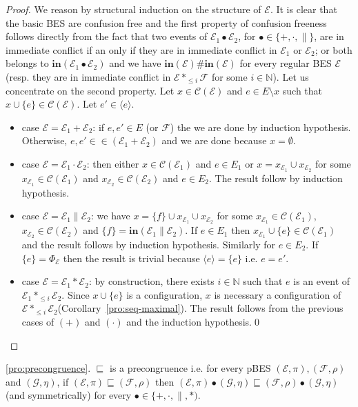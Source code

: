 \documentclass{llncs}
\newcommand{\C}{\mathcal{C}}
\newcommand{\N}{\mathbb{N}}
\newcommand{\EE}{\mathcal{E}}
\newcommand{\FF}{\mathcal{F}}
\newcommand{\G}{\mathcal{G}}
\newcommand{\refby}{\sqsubseteq}
\newcommand{\init}{\mathbf{in}}
\newcommand{\<}{\langle}
\renewcommand{\>}{\rangle}
\newcommand{\exit}{\Phi}
\begin{document}
\begin{proof}
We reason by structural induction on the structure of $\EE$. It is clear that the basic BES are confusion free and the first property of confusion freeness follows directly from the fact that two events of $\EE_1\bullet \EE_2$, for  $\bullet\in\{+,\cdot,\|\}$, are in immediate conflict if an only if they are in immediate conflict in $\EE_1$ or $\EE_2$; or both belongs to $\init(\EE_1\bullet\EE_2)$ and we have $\init(\EE)\#\init(\EE)$ for every regular BES $\EE$(resp. they are in immediate conflict in $\EE*_{\le i}\FF$ for some $i\in\N$). Let us concentrate on the second property. Let $x\in\C(\EE)$ and $e\in E\setminus x$ such that $x\cup\{e\}\in\C(\EE)$. Let $e'\in\<e\>$.
\begin{itemize}
\item case $\EE = \EE_1+\EE_2$: if $e,e'\in E$ (or $\FF$) the we are done by induction hypothesis. Otherwise, $e,e'\in \in(\EE_1+\EE_2)$ and we are done because $x=\emptyset$.
\item case $\EE = \EE_1\cdot\EE_2$: then either $x\in\C(\EE_1)$ and $e\in E_1$ or $x = x_{\EE_1}\cup x_{\EE_2}$ for some $x_{\EE_1}\in\C(\EE_1)$ and $ x_{\EE_2}\in\C(\EE_2)$ and $e\in E_2$. The result follow by induction hypothesis.
\item case $\EE = \EE_1\|\EE_2$: we have $x = \{f\}\cup x_{\EE_1}\cup x_{\EE_2}$ for some $x_{\EE_1}\in\C(\EE_1)$, $ x_{\EE_2}\in\C(\EE_2)$ and $\{f\} = \init(\EE_1\|\EE_2)$. If $e\in E_1$ then $x_{\EE_1}\cup\{e\}\in\C(\EE_1)$ and the result follows by induction hypothesis. Similarly for $e\in E_2$. If $\{e\} = \exit_{\EE}$ then the result is trivial because $\<e\> = \{e\}$ i.e. $e=e'$.
\item case $\EE = \EE_1*\EE_2$: by construction, there exists $i\in\N$ such that $e$ is an event of $\EE_1*_{\le i}\EE_2$. Since $x\cup\{e\}$ is a configuration, $x$ is necessary a configuration of $\EE*_{\le i}\EE_2$(Corollary~\ref{pro:seq-maximal}). The result follows from the previous cases of $(+)$ and $(\cdot)$ and the induction hypothesis.\qed
\end{itemize}
\end{proof}

\begin{repproposition}{\ref{pro:precongruence}.}
$\refby$ is a precongruence i.e. for every pBES $(\EE,\pi), (\FF,\rho)$ and $(\G,\eta)$, if $(\EE,\pi)\refby (\FF,\rho)$ then $(\EE,\pi)\bullet(\G,\eta)\refby (\FF,\rho)\bullet(\G,\eta)$ (and symmetrically) for every $\bullet\in\{+,\cdot,\|,*)$.
\end{repproposition}
\end{document}
